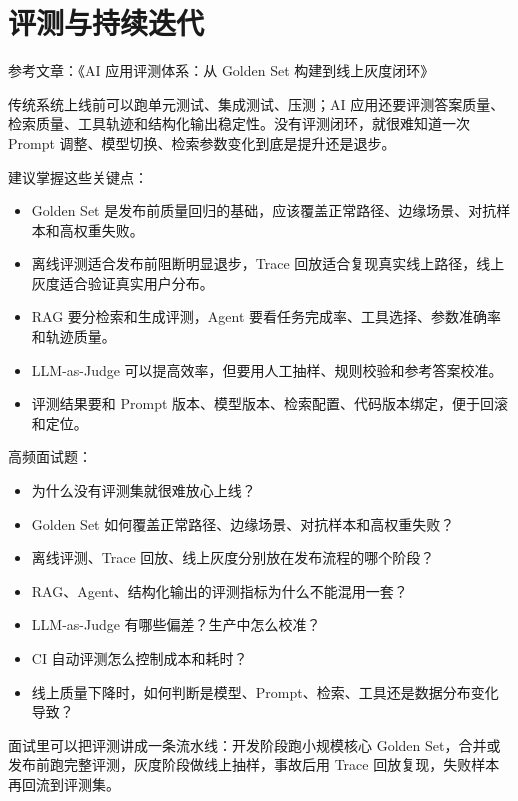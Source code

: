 \documentclass[9pt,a4paper,twocolumn]{ctexart}
\begin{document}
\section*{评测与持续迭代}


参考文章：《AI 应用评测体系：从 Golden Set 构建到线上灰度闭环》



传统系统上线前可以跑单元测试、集成测试、压测；AI 应用还要评测答案质量、检索质量、工具轨迹和结构化输出稳定性。没有评测闭环，就很难知道一次 Prompt 调整、模型切换、检索参数变化到底是提升还是退步。



建议掌握这些关键点：


\begin{itemize}[itemsep=1pt, topsep=2pt]
  \item Golden Set 是发布前质量回归的基础，应该覆盖正常路径、边缘场景、对抗样本和高权重失败。
  \item 离线评测适合发布前阻断明显退步，Trace 回放适合复现真实线上路径，线上灰度适合验证真实用户分布。
  \item RAG 要分检索和生成评测，Agent 要看任务完成率、工具选择、参数准确率和轨迹质量。
  \item LLM-as-Judge 可以提高效率，但要用人工抽样、规则校验和参考答案校准。
  \item 评测结果要和 Prompt 版本、模型版本、检索配置、代码版本绑定，便于回滚和定位。
\end{itemize}


高频面试题：


\begin{itemize}[itemsep=1pt, topsep=2pt]
  \item 为什么没有评测集就很难放心上线？
  \item Golden Set 如何覆盖正常路径、边缘场景、对抗样本和高权重失败？
  \item 离线评测、Trace 回放、线上灰度分别放在发布流程的哪个阶段？
  \item RAG、Agent、结构化输出的评测指标为什么不能混用一套？
  \item LLM-as-Judge 有哪些偏差？生产中怎么校准？
  \item CI 自动评测怎么控制成本和耗时？
  \item 线上质量下降时，如何判断是模型、Prompt、检索、工具还是数据分布变化导致？
\end{itemize}


面试里可以把评测讲成一条流水线：开发阶段跑小规模核心 Golden Set，合并或发布前跑完整评测，灰度阶段做线上抽样，事故后用 Trace 回放复现，失败样本再回流到评测集。
\end{document}
